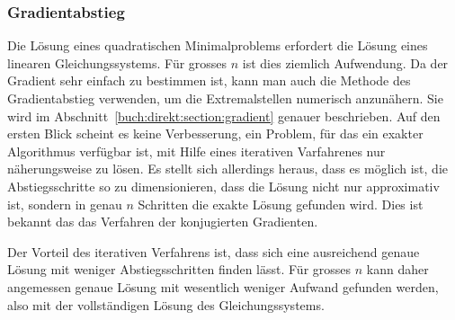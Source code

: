 %
%
\subsubsection{Gradientabstieg}
Die Lösung eines quadratischen Minimalproblems erfordert die Lösung eines
linearen Gleichungssystems.
Für grosses $n$ ist dies ziemlich Aufwendung.
Da der Gradient sehr einfach zu bestimmen ist, kann man auch die Methode
des Gradientabstieg verwenden, um die Extremalstellen numerisch
anzunähern.
Sie wird im Abschnitt~\ref{buch:direkt:section:gradient} genauer
beschrieben.
Auf den ersten Blick scheint es keine Verbesserung, ein Problem, für
das ein exakter Algorithmus verfügbar ist, mit Hilfe eines iterativen
Varfahrenes nur näherungsweise zu lösen.
Es stellt sich allerdings heraus, dass es möglich ist, die Abstiegsschritte
so zu dimensionieren, dass die Lösung nicht nur approximativ ist, sondern
in genau $n$ Schritten die exakte Lösung gefunden wird.
Dies ist bekannt das das Verfahren der konjugierten Gradienten.

Der Vorteil des iterativen Verfahrens ist, dass sich eine ausreichend
genaue Lösung mit weniger Abstiegsschritten finden lässt.
Für grosses $n$ kann daher angemessen genaue Lösung mit wesentlich
weniger Aufwand gefunden werden, also mit der vollständigen Lösung des
Gleichungssystems.


